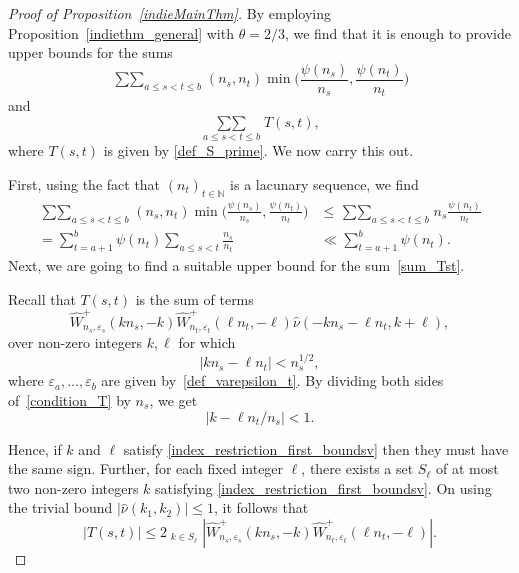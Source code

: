 \documentclass[12pt, reqno]{amsart}
\theoremstyle{definition}
\theoremstyle{remark}
\numberwithin{equation}{section}
\newcommand{\what}[1]{\widehat{#1}}
\def\eps{\varepsilon}
\def\leq{\leqslant}
\def \bN {\mathbb N}
\begin{document}
\begin{proof} [Proof of Proposition~\ref{indieMainThm}]
By employing Proposition~\ref{indiethm_general} with $\theta=2/3$, we find that it is enough to provide upper bounds for the sums
\begin{equation*}
\mathop{\sum\sum}_{a\leq s<t\leq b} (n_s,n_t)\min\Big(\frac{\psi(n_s)}{n_s},\frac{\psi(n_t)}{n_t}\Big)
\end{equation*}
and
\begin{equation} \label{sum_Tst}
\mathop{\sum\sum}\limits_{a\leq s<t\leq b} T(s,t),
\end{equation}
where $T(s,t)$ is given by \eqref{def_S_prime}.
We now carry this out.

First, using the fact that $(n_t)_{t\in\bN}$ is a lacunary sequence, we find
\begin{equation*} \label{ub_gcd}
\begin{aligned}
	\mathop{\sum\sum}_{a\leq s<t\leq b} (n_s,n_t)\min\Big(\frac{\psi(n_s)}{n_s},\frac{\psi(n_t)}{n_t}\Big)
	&\leq \mathop{\sum\sum}_{a\leq s<t\leq b} n_s \frac{\psi(n_t)}{n_t}\\
	=\sum_{t=a+1}^b \psi(n_t)\sum_{a\leq s < t}\frac{n_s}{n_t}
	&\ll \sum_{t=a+1}^b \psi(n_t).
\end{aligned}
\end{equation*}
Next, we are going to find a suitable upper bound for the sum~\eqref{sum_Tst}.

Recall that $T(s,t)$ is the sum of terms 
\[
\what{W}_{n_s,\varepsilon_s}^{+}(kn_s,-k)\what{W}_{n_t,\varepsilon_t}^{+}(\ell n_t,-\ell)  \what{\nu}\left( -kn_s-\ell n_t,k+\ell\right),
\]
over non-zero integers $k,\ell$ for which
\begin{equation} \label{condition_T}
|k n_s-\ell n_t|< n_s^{1/2},
\end{equation}
where $\eps_a, \ldots, \eps_b$ are given by~\eqref{def_varepsilon_t}. By dividing both sides of~\eqref{condition_T} by $n_s$, we get
\begin{equation} \label{index_restriction_first_boundsv}
|k -\ell n_t/n_s|< 1.
\end{equation}


Hence, if $k$ and $\ell$ satisfy \eqref{index_restriction_first_boundsv} then they must have the same sign. Further, for each fixed integer $\ell$, there exists a set $S_{\ell}$ of at most two non-zero integers  $k$  satisfying \eqref{index_restriction_first_boundsv}.
On using the trivial bound  $|\what{\nu}(k_1,k_2)| \leq 1 $, it follows that
$$
|T(s,t)| \leq 2 \mathop{\mathop{\sum}_{ k, \ell \in \bN} }_{k \in S_{\ell}} |\what{W}_{n_s,\varepsilon_s}^{+}(k n_s,-k) \what{W}_{n_t,\varepsilon_t}^{+}(\ell n_t,-\ell) |.
$$


\end{proof}
\end{document}
